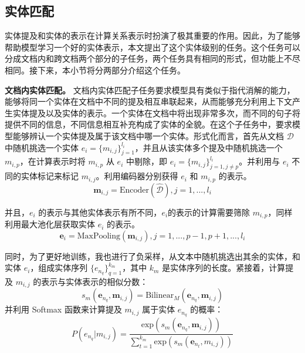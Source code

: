 \subsection{实体匹配}
实体提及和实体的表示在计算关系表示时扮演了极其重要的作用。因此，为了能够帮助模型学习一个好的实体表示，本文提出了这个实体级别的任务。这个任务可以分成文档内和跨文档两个部分的子任务，两个任务具有相同的形式，但功能上不尽相同。接下来，本小节将分两部分介绍这个任务。

\smallskip
\noindent
\textbf{文档内实体匹配。} 文档内实体匹配子任务要求模型具有类似于指代消解的能力，能够将同一个实体在文档中不同的提及相互串联起来，从而能够充分利用上下文产生实体提及以及实体的表示。一个实体在文档中将出现非常多次，而不同的句子将提供不同的信息，不同信息相互补充构成了实体的全貌。在这个子任务中，要求模型能够辨认一个实体提及属于该文档中哪一个实体。形式化而言，首先从文档 $\mathcal{D}$ 中随机挑选一个实体 $e_i = \{m_{i,j}\}_{j=1}^{l_i}$，并且从该实体多个提及中随机挑选一个 $m_{i,p}$，在计算表示时将 $m_{i,p}$ 从 $e_i$ 中剔除，即 $e_i = \{m_{i,j}\}_{j=1, j \neq p}^{l_i}$。并利用与 $e_i$ 不同的实体标记来标记 $m_{i,j}$。利用编码器分别获得 $e_i$ 和 $m_{i, p}$ 的表示。
\begin{equation}
	\mathbf{m}_{i, j} = \text{Encoder}(\mathcal{\hat{D}}), j = 1,...,l_i
\end{equation}

并且，$e_i$ 的表示与其他实体表示有所不同，$e_i$的表示的计算需要筛除 $m_{i,p}$，同样利用最大池化层获取实体 $e_i$ 的表示。
\begin{equation}
	\mathbf{e}_i = \text{MaxPooling}(\mathbf{m}_{i,j}), j = 1,...,p-1,p+1,...,l_i
\end{equation}

同时，为了更好地训练，我也进行了负采样，从文本中随机挑选出其余的实体，和实体 $e_i$，组成实体序列 $\{e_{n_q}\}_{q=1}^{k_m}$，其中 $k_m$ 是实体序列的长度。紧接着，计算提及 $m_{i,j}$ 的表示与实体表示的相似分数：
\begin{equation}
	s_m(\mathbf{e}_{n_q}, \mathbf{m}_{i,j}) = \text{Bilinear}_M(\mathbf{e}_{n_q}, \mathbf{m}_{i,j})
\end{equation}
并利用 Softmax 函数来计算提及 $m_{i,j}$ 属于实体 $e_{n_q}$ 的概率：
\begin{equation}
	P(e_{n_q}|m_{i,j}) = \frac{\text{exp}(s_m(\mathbf{e}_{n_q}, \mathbf{m}_{i,j}))}{\sum_{t=1}^{k_m}\text{exp}(s_m(\mathbf{e}_{n_t}, m_{i,j}))}
	\label{loss:m:intra}
\end{equation}

\hspace*{\fill}

